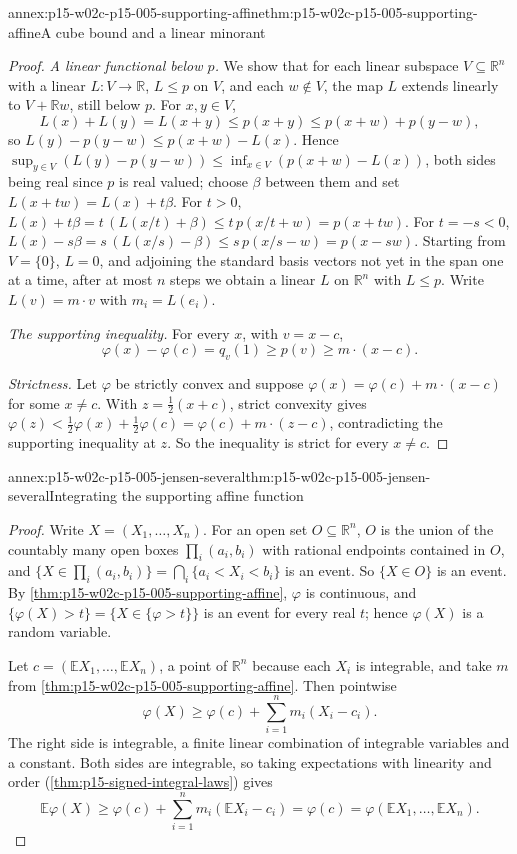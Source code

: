 \begin{annexitem}{annex:p15-w02c-p15-005-supporting-affine}{thm:p15-w02c-p15-005-supporting-affine}{A cube bound and a linear minorant}
\begin{proof}
\emph{A linear functional below \(p\).} We show that for each linear
subspace \(V\subseteq\mathbb R^n\) with a linear \(L:V\to\mathbb R\),
\(L\leq p\) on \(V\), and each \(w\notin V\), the map \(L\) extends
linearly to \(V+\mathbb Rw\), still below \(p\). For \(x,y\in V\),
\[
 L(x)+L(y)=L(x+y)\leq p(x+y)\leq p(x+w)+p(y-w),
\]
so \(L(y)-p(y-w)\leq p(x+w)-L(x)\). Hence
\(\sup_{y\in V}(L(y)-p(y-w))\leq\inf_{x\in V}(p(x+w)-L(x))\), both
sides being real since \(p\) is real valued; choose \(\beta\) between
them and set \(L(x+tw)=L(x)+t\beta\). For \(t>0\),
\(L(x)+t\beta=t\,(L(x/t)+\beta)\leq t\,p(x/t+w)=p(x+tw)\). For
\(t=-s<0\), \(L(x)-s\beta=s\,(L(x/s)-\beta)\leq s\,p(x/s-w)=p(x-sw)\).
Starting from \(V=\{0\}\), \(L=0\), and adjoining the standard basis
vectors not yet in the span one at a time, after at most \(n\) steps
we obtain a linear \(L\) on \(\mathbb R^n\) with \(L\leq p\). Write
\(L(v)=m\cdot v\) with \(m_i=L(e_i)\).

\emph{The supporting inequality.} For every \(x\), with \(v=x-c\),
\[
 \varphi(x)-\varphi(c)=q_v(1)\geq p(v)\geq m\cdot(x-c).
\]

\emph{Strictness.} Let \(\varphi\) be strictly convex and suppose
\(\varphi(x)=\varphi(c)+m\cdot(x-c)\) for some \(x\neq c\). With
\(z=\frac12(x+c)\), strict convexity gives
\(\varphi(z)<\frac12\varphi(x)+\frac12\varphi(c)
=\varphi(c)+m\cdot(z-c)\), contradicting the supporting inequality at
\(z\). So the inequality is strict for every \(x\neq c\).
\end{proof}
\end{annexitem}

\begin{annexitem}{annex:p15-w02c-p15-005-jensen-several}{thm:p15-w02c-p15-005-jensen-several}{Integrating the supporting affine function}
\begin{proof}
Write \(X=(X_1,\ldots,X_n)\). For an open set \(O\subseteq\mathbb R^n\),
\(O\) is the union of the countably many open boxes
\(\prod_i(a_i,b_i)\) with rational endpoints contained in \(O\), and
\(\{X\in\prod_i(a_i,b_i)\}=\bigcap_i\{a_i<X_i<b_i\}\) is an event. So
\(\{X\in O\}\) is an event. By
\cref{thm:p15-w02c-p15-005-supporting-affine}, \(\varphi\) is
continuous, and \(\{\varphi(X)>t\}=\{X\in\{\varphi>t\}\}\) is an event
for every real \(t\); hence \(\varphi(X)\) is a random variable.

Let \(c=(\mathbb EX_1,\ldots,\mathbb EX_n)\), a point of
\(\mathbb R^n\) because each \(X_i\) is integrable, and take \(m\) from
\cref{thm:p15-w02c-p15-005-supporting-affine}. Then pointwise
\[
 \varphi(X)\geq\varphi(c)+\sum_{i=1}^nm_i(X_i-c_i).
\]
The right side is integrable, a finite linear combination of
integrable variables and a constant. Both sides are integrable, so
taking expectations with linearity and order
(\cref{thm:p15-signed-integral-laws}) gives
\[
 \mathbb E\varphi(X)\geq\varphi(c)+\sum_{i=1}^nm_i(\mathbb EX_i-c_i)
 =\varphi(c)=\varphi(\mathbb EX_1,\ldots,\mathbb EX_n).
\]
\end{proof}
\end{annexitem}

